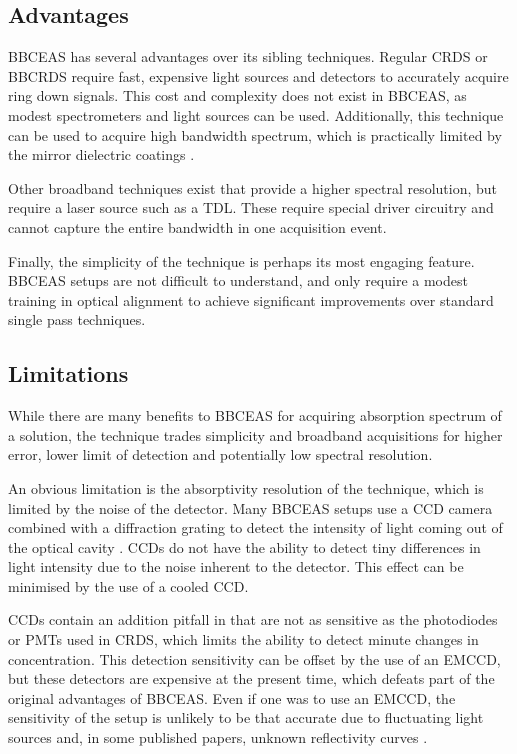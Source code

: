 \subsection{Advantages}\label{subsec:bbceas_adv}

\acl{BBCEAS} has several advantages over its sibling techniques. Regular
\ac{CRDS} or \ac{BBCRDS} require fast, expensive light sources and detectors to
accurately acquire ring down signals. This cost and complexity does not exist
in \ac{BBCEAS}, as modest spectrometers and light sources can be used.
Additionally, this technique can be used to acquire high bandwidth spectrum,
which is practically limited by the mirror dielectric coatings
\cite{Islam:2007ea}.

Other broadband techniques exist that provide a higher spectral resolution, but
require a laser source such as a \acl{TDL}. These require special driver
circuitry and cannot capture the entire bandwidth in one acquisition event.

Finally, the simplicity of the technique is perhaps its most engaging feature.
\ac{BBCEAS} setups are not difficult to understand, and only require a modest
training in optical alignment to achieve significant improvements over standard
single pass techniques.



\subsection{Limitations}\label{subsec:bbceas_limits}

While there are many benefits to \ac{BBCEAS} for acquiring absorption spectrum
of a solution, the technique trades simplicity and broadband acquisitions for
higher error, lower limit of detection and potentially low spectral
resolution.


An obvious limitation is the absorptivity resolution of the technique, which is
limited by the noise of the detector. Many \ac{BBCEAS} setups use a \ac{CCD}
camera combined with a diffraction grating to detect the intensity of light
coming out of the optical cavity \cite{Berden:2009wk}.  \acp{CCD} do not have
the ability to detect tiny differences in light intensity due to the noise
inherent to the detector. This effect can be minimised by the use of a cooled
\ac{CCD}.

\acp{CCD} contain an addition pitfall in that are not as sensitive as the
photodiodes or \acp{PMT} used in \ac{CRDS}, which limits the ability to detect
minute changes in concentration. This detection sensitivity can be offset by
the use of an \ac{EMCCD}, but these detectors are expensive at the present
time, which defeats part of the original advantages of \ac{BBCEAS}. Even if one
was to use an \ac{EMCCD}, the sensitivity of the setup is unlikely to be that
accurate due to fluctuating light sources and, in some published papers,
unknown reflectivity curves \cite{Islam:2007ea}.

